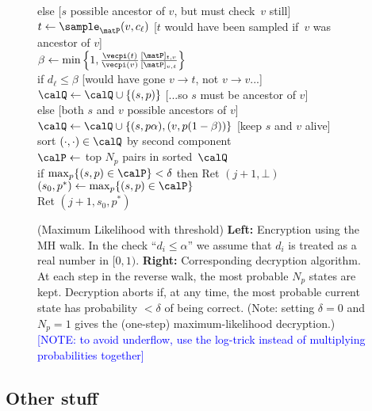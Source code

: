 \begin{figure}
{\nnudge else \hfill{\tiny [$s$ possible ancestor of $v$, but must check~$v$ still]}\\
\nnudge\nudge $t \gets \sample_{\matP}(v,c_\ell)$ \hfill{\tiny [$t$ would have been sampled if~$v$ was ancestor of $v$]}\\
\nnudge\nudge $\beta \gets
\min\left\{1,\frac{\vecpi(t)}{\vecpi(v)}\frac{[\matP]_{t,v}}{[\matP]_{v,t}}
\right\}$\\
\nnudge\nudge if $d_\ell \leq \beta$ \hfill{\tiny [would have gone $v\to t$, not $v \to v$...]}\\ 
\nnudge\nudge\nudge $\calQ \gets \calQ \cup \{(s,p)\}$ \hfill{\tiny [...so $s$ must be ancestor of $v$]}\\
\nnudge\nudge else \hfill{\tiny [both $s$ and $v$ possible ancestors of $v$]}\\
\nnudge\nudge\nudge $\calQ \gets \calQ \cup \{(s,p\alpha),(v,p(1-\beta))\}$ \hfill{\tiny [keep $s$ and $v$ alive]}  \\
\nudge sort $(\cdot,\cdot)\in\calQ$ by second component\\
\nudge $\calP \gets$ top $N_p$ pairs in sorted~$\calQ$\\
\nudge if $\max_{p}\{(s,p) \in \calP\} < \delta$ then Ret $(j+1,\bot)$\\
$(s_0,p^*) \gets \max_{p}\{ (s,p) \in \calP \}$\\
Ret $(j+1,s_0,p^*)$ 
} 
\caption{(Maximum Likelihood with threshold) \textbf{Left:} Encryption using the MH walk. In the check ``$d_i
\leq \alpha$'' we assume that $d_i$ is treated as a real number in
$[0,1)$. \textbf{Right:} Corresponding decryption algorithm.  At each
step in the reverse walk, the most probable $N_p$ states are
kept. Decryption aborts if, at any time, the most probable current
state has probability $< \delta$ of being correct. (Note: setting $\delta=0$ and $N_p=1$ gives the (one-step) maximum-likelihood decryption.) \textcolor{blue}{[NOTE: to avoid underflow, use the
log-trick instead of multiplying probabilities together]}}
\label{fig:walk-encrypt-2} 
\end{figure}

\subsection{Other stuff}

